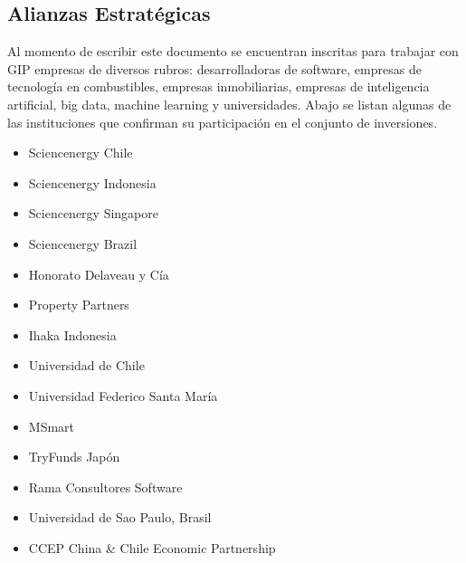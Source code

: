 \subsection{Alianzas Estratégicas}
Al momento de escribir este documento se encuentran inscritas para trabajar con GIP empresas de diversos rubros: desarrolladoras de software, empresas de tecnología en combustibles, empresas inmobiliarias, empresas de inteligencia artificial, big data, machine learning y universidades. Abajo se listan algunas de las instituciones que confirman su participación en el conjunto de inversiones. 

\begin{itemize}
\item Sciencenergy Chile
\item Sciencenergy Indonesia
\item Sciencenergy Singapore
\item Sciencenergy Brazil
\item Honorato Delaveau y Cía
\item Property Partners
\item Ihaka Indonesia
\item Universidad de Chile
\item Universidad Federico Santa María
\item MSmart
\item TryFunds Japón
\item Rama Consultores  Software
\item Universidad de Sao Paulo, Brasil
\item CCEP China & Chile Economic Partnership
\end{itemize}

